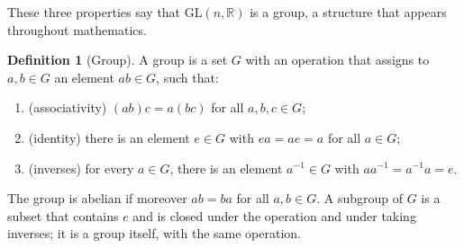 \documentclass[11pt]{article}
\theoremstyle{definition}
\newtheorem{definition}{Definition}[section]
\theoremstyle{plain}
\theoremstyle{remark}
\begin{document}
These three properties say that $\mathrm{GL}(n, \mathbb{R})$ is a group, a structure that appears throughout mathematics.

\begin{definition}[Group]\label{def:group}
    A group is a set $G$ with an operation that assigns to $a, b \in G$ an element $ab \in G$, such that:
    \begin{enumerate}
        \item (associativity) $(ab)c = a(bc)$ for all $a, b, c \in G$;
        \item (identity) there is an element $e \in G$ with $ea = ae = a$ for all $a \in G$;
        \item (inverses) for every $a \in G$, there is an element $a^{-1} \in G$ with $aa^{-1} = a^{-1}a = e$.
    \end{enumerate}
    The group is abelian if moreover $ab = ba$ for all $a, b \in G$. A subgroup of $G$ is a subset that contains $e$ and is closed under the operation and under taking inverses; it is a group itself, with the same operation.
\end{definition}
\end{document}
